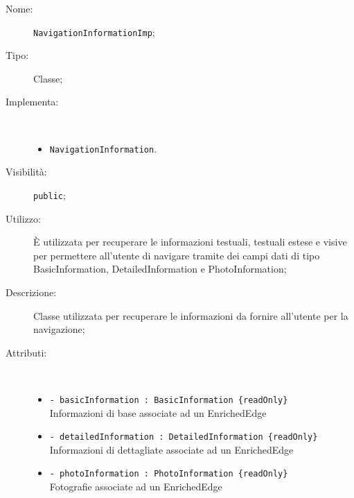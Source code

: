 \documentclass[../DefinizioneDiProdotto.tex]{subfiles}
\begin{document}
    \begin{description}
\item[Nome:] \texttt{NavigationInformationImp};
\item[Tipo:] Classe;
\item[Implementa:] \
\begin{itemize}
\item \texttt{NavigationInformation}.

\end{itemize}
\item[Visibilità:] \texttt{public};
\item[Utilizzo:] È utilizzata per recuperare le informazioni testuali, testuali estese e visive per permettere all'utente di navigare tramite dei campi dati di tipo BasicInformation, DetailedInformation e PhotoInformation;
\item[Descrizione:] Classe utilizzata per recuperare le informazioni da fornire all'utente per la navigazione;
\item[Attributi:] \
\begin{itemize}
\item \texttt{- basicInformation : BasicInformation \{readOnly\}}\\
Informazioni di base associate ad un EnrichedEdge

\item \texttt{- detailedInformation : DetailedInformation \{readOnly\}}\\
Informazioni di dettagliate associate ad un EnrichedEdge

\item \texttt{- photoInformation : PhotoInformation \{readOnly\}}\\
Fotografie associate ad un EnrichedEdge


\end{itemize}
\end{description}
\end{document}
